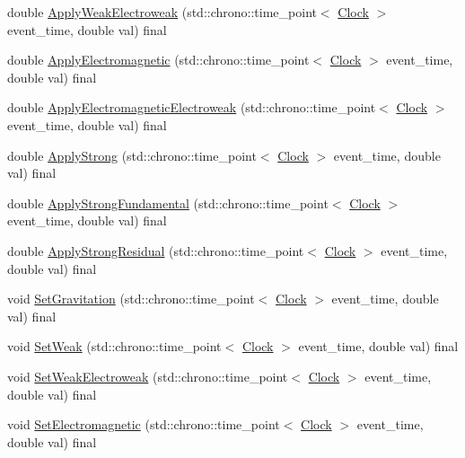 \begin{DoxyCompactItemize}
\item 
double \hyperlink{class_law_ae8a5d1d09686d79f7814c8800791460b}{Apply\+Weak\+Electroweak} (std\+::chrono\+::time\+\_\+point$<$ \hyperlink{universe_8h_a0ef8d951d1ca5ab3cfaf7ab4c7a6fd80}{Clock} $>$ event\+\_\+time, double val) final
\item 
double \hyperlink{class_law_a418791aee2a9204a99d3a917b86fafd3}{Apply\+Electromagnetic} (std\+::chrono\+::time\+\_\+point$<$ \hyperlink{universe_8h_a0ef8d951d1ca5ab3cfaf7ab4c7a6fd80}{Clock} $>$ event\+\_\+time, double val) final
\item 
double \hyperlink{class_law_a4485046db890a95cea16573042a4f4f6}{Apply\+Electromagnetic\+Electroweak} (std\+::chrono\+::time\+\_\+point$<$ \hyperlink{universe_8h_a0ef8d951d1ca5ab3cfaf7ab4c7a6fd80}{Clock} $>$ event\+\_\+time, double val) final
\item 
double \hyperlink{class_law_ab38659b209055df7e59f4bcd1b9e545a}{Apply\+Strong} (std\+::chrono\+::time\+\_\+point$<$ \hyperlink{universe_8h_a0ef8d951d1ca5ab3cfaf7ab4c7a6fd80}{Clock} $>$ event\+\_\+time, double val) final
\item 
double \hyperlink{class_law_a57d05f26e1c0ee953260ebd3780248f8}{Apply\+Strong\+Fundamental} (std\+::chrono\+::time\+\_\+point$<$ \hyperlink{universe_8h_a0ef8d951d1ca5ab3cfaf7ab4c7a6fd80}{Clock} $>$ event\+\_\+time, double val) final
\item 
double \hyperlink{class_law_a266f86cdcc01e813249a2f192ab85eb3}{Apply\+Strong\+Residual} (std\+::chrono\+::time\+\_\+point$<$ \hyperlink{universe_8h_a0ef8d951d1ca5ab3cfaf7ab4c7a6fd80}{Clock} $>$ event\+\_\+time, double val) final
\item 
void \hyperlink{class_law_a908ccc2b0a561a7324a15393ec157219}{Set\+Gravitation} (std\+::chrono\+::time\+\_\+point$<$ \hyperlink{universe_8h_a0ef8d951d1ca5ab3cfaf7ab4c7a6fd80}{Clock} $>$ event\+\_\+time, double val) final
\item 
void \hyperlink{class_law_a1009b4e0bc0b91f41d48dc137529e97b}{Set\+Weak} (std\+::chrono\+::time\+\_\+point$<$ \hyperlink{universe_8h_a0ef8d951d1ca5ab3cfaf7ab4c7a6fd80}{Clock} $>$ event\+\_\+time, double val) final
\item 
void \hyperlink{class_law_a65e5e757041c1e72bb046eccbb6d66db}{Set\+Weak\+Electroweak} (std\+::chrono\+::time\+\_\+point$<$ \hyperlink{universe_8h_a0ef8d951d1ca5ab3cfaf7ab4c7a6fd80}{Clock} $>$ event\+\_\+time, double val) final
\item 
void \hyperlink{class_law_acabe1a3113c207368f3bb6fe81e13963}{Set\+Electromagnetic} (std\+::chrono\+::time\+\_\+point$<$ \hyperlink{universe_8h_a0ef8d951d1ca5ab3cfaf7ab4c7a6fd80}{Clock} $>$ event\+\_\+time, double val) final

\end{DoxyCompactItemize}
